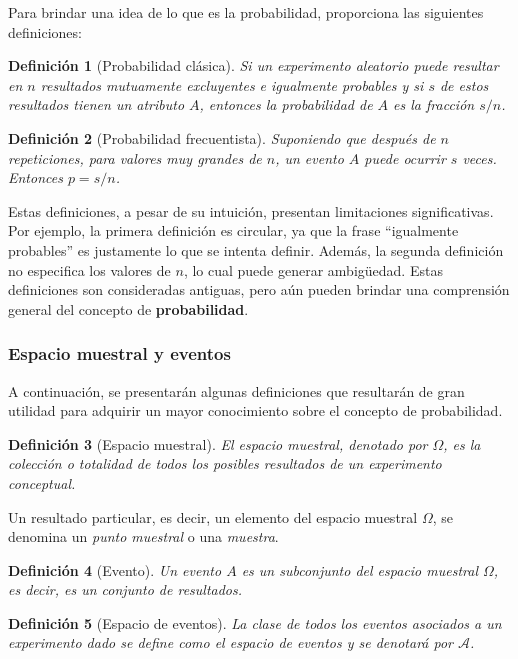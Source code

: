 \documentclass[12pt]{article}
\newtheorem{definition}{Definición}
\begin{document}
Para brindar una idea de lo que es la probabilidad, \cite{mood86} proporciona las siguientes definiciones:


\begin{definition}[Probabilidad clásica]
    Si un experimento aleatorio puede resultar en $n$ resultados mutuamente excluyentes e igualmente probables y si $s$ de estos resultados tienen un atributo $A$, entonces la probabilidad de $A$ es la fracción $s/n$.
\end{definition}

\begin{definition}[Probabilidad frecuentista]
    Suponiendo que después de $n$ repeticiones, para valores muy grandes de $n$, un evento $A$ puede ocurrir $s$ veces. Entonces $p=s/n$.
\end{definition}

Estas definiciones, a pesar de su intuición, presentan limitaciones significativas. Por ejemplo, la primera definición es circular, ya que la frase ``igualmente probables'' es justamente lo que se intenta definir. Además, la segunda definición no especifica los valores de $n$, lo cual puede generar ambigüedad. Estas definiciones son consideradas antiguas, pero aún pueden brindar una comprensión general del concepto de \textbf{probabilidad}.\\

\subsubsection{Espacio muestral y eventos}
A continuación, se presentarán algunas definiciones que resultarán de gran utilidad para adquirir un mayor conocimiento sobre el concepto de probabilidad. 
\begin{definition}[Espacio muestral]
    El espacio muestral, denotado por $\Omega$, es la colección o totalidad de todos los posibles resultados de un experimento conceptual.
\end{definition}

Un resultado particular, es decir, un elemento del espacio muestral $\Omega$, se denomina un \textit{punto muestral} o una \textit{muestra}.

\begin{definition}[Evento]
Un evento $A$ es un subconjunto del espacio muestral $\Omega$, es decir, es un conjunto de resultados.
\end{definition}

\begin{definition}[Espacio de eventos]
    La clase de todos los eventos asociados a un experimento dado se define como el espacio de eventos y se denotará por $\mathscr{A}$.
\end{definition}
\end{document}
